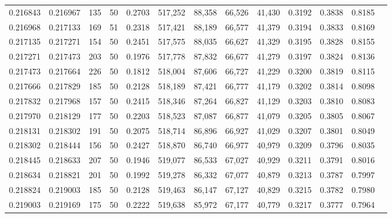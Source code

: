 \begin{tabular}{rrrrrrrrrrrrr}
0.216843 & 0.216967 &   135 &  50 &                                     0.2703 & 517,252 &  88,358 &  66,526 &  41,430 & 0.3192 & 0.3838 & 0.8185 \\
0.216968 & 0.217133 &   169 &  51 &                                     0.2318 & 517,421 &  88,189 &  66,577 &  41,379 & 0.3194 & 0.3833 & 0.8169 \\
0.217135 & 0.217271 &   154 &  50 &                                     0.2451 & 517,575 &  88,035 &  66,627 &  41,329 & 0.3195 & 0.3828 & 0.8155 \\
0.217271 & 0.217473 &   203 &  50 &                                     0.1976 & 517,778 &  87,832 &  66,677 &  41,279 & 0.3197 & 0.3824 & 0.8136 \\
0.217473 & 0.217664 &   226 &  50 &                                     0.1812 & 518,004 &  87,606 &  66,727 &  41,229 & 0.3200 & 0.3819 & 0.8115 \\
0.217666 & 0.217829 &   185 &  50 &                                     0.2128 & 518,189 &  87,421 &  66,777 &  41,179 & 0.3202 & 0.3814 & 0.8098 \\
0.217832 & 0.217968 &   157 &  50 &                                     0.2415 & 518,346 &  87,264 &  66,827 &  41,129 & 0.3203 & 0.3810 & 0.8083 \\
0.217970 & 0.218129 &   177 &  50 &                                     0.2203 & 518,523 &  87,087 &  66,877 &  41,079 & 0.3205 & 0.3805 & 0.8067 \\
0.218131 & 0.218302 &   191 &  50 &                                     0.2075 & 518,714 &  86,896 &  66,927 &  41,029 & 0.3207 & 0.3801 & 0.8049 \\
0.218302 & 0.218444 &   156 &  50 &                                     0.2427 & 518,870 &  86,740 &  66,977 &  40,979 & 0.3209 & 0.3796 & 0.8035 \\
0.218445 & 0.218633 &   207 &  50 &                                     0.1946 & 519,077 &  86,533 &  67,027 &  40,929 & 0.3211 & 0.3791 & 0.8016 \\
0.218634 & 0.218821 &   201 &  50 &                                     0.1992 & 519,278 &  86,332 &  67,077 &  40,879 & 0.3213 & 0.3787 & 0.7997 \\
0.218824 & 0.219003 &   185 &  50 &                                     0.2128 & 519,463 &  86,147 &  67,127 &  40,829 & 0.3215 & 0.3782 & 0.7980 \\
0.219003 & 0.219169 &   175 &  50 &                                     0.2222 & 519,638 &  85,972 &  67,177 &  40,779 & 0.3217 & 0.3777 & 0.7964 \\

\end{tabular}
